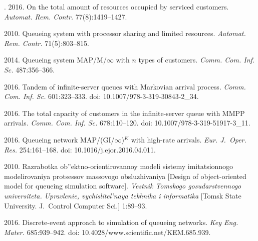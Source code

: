 \begin{multicols}{2}
{{\begin{thebibliography}{99}
. 2016. 
On the total amount of resources occupied by serviced customers. 
\textit{Automat. Rem. Contr.} 77(8):1419--1427.



 2010. 
Queueing system with processor sharing and limited resources. 
\textit{Automat. Rem. Contr.} 71(5):803--815.

 2014. 
Queueing system MAP/M/$\infty$ with $n$ types of customers. 
\textit{Comm. Com. Inf. Sc.} 487:356--366.

 2016. 
Tandem of infinite-server queues with Markovian arrival process. 
\textit{Comm. Com. Inf. Sc.} 601:323--333. 
doi: 10.1007/978-3-319-30843-2\_34.

  2016. 
The total capacity of customers in the infinite-server queue with MMPP arrivals. 
\textit{Comm. Com. Inf. Sc.} 678:110--120. 
doi: 10.1007/978-3-319-51917-3\_11.
    


 2016. Queueing network MAP/(GI/$\infty$)$^K$ 
with high-rate arrivals. \textit{Eur. J.~Oper. Res.} 254:161--168. 
doi: 10.1016/j.ejor.2016.04.011.





 2010. 
Razrabotka ob''ektno-orientirovannoy modeli sistemy imitatsionnogo modelirovaniya 
protsessov massovogo obsluzhivaniya 
[Design of object-oriented model for queueing simulation software]. 
\textit{Vestnik Tomskogo gosudarstvennogo universiteta. Upravlenie, 
vychislitel'naya tekhnika i informatika} 
[Tomsk State University. J.~Control Computer Sci.] 1:89--93.

 2016. 
Discrete-event approach to simulation of queueing networks. 
\textit{Key Eng. Mater.} 685:939--942. 
doi: 10.4028/www.scientific.net/KEM.685.939.

    
\end{thebibliography} }
 }

\end{multicols}

\vspace*{-6pt}

